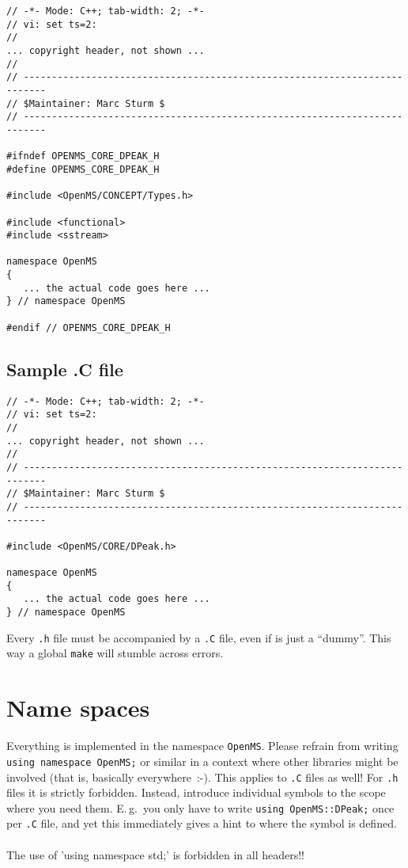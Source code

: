 \documentclass[a4]{article}
\begin{document}
\begin{footnotesize}
\begin{verbatim}
// -*- Mode: C++; tab-width: 2; -*-
// vi: set ts=2:
//
... copyright header, not shown ...
//
// --------------------------------------------------------------------------
// $Maintainer: Marc Sturm $
// --------------------------------------------------------------------------

#ifndef OPENMS_CORE_DPEAK_H
#define OPENMS_CORE_DPEAK_H

#include <OpenMS/CONCEPT/Types.h>

#include <functional>
#include <sstream>

namespace OpenMS
{
   ... the actual code goes here ...
} // namespace OpenMS

#endif // OPENMS_CORE_DPEAK_H
\end{verbatim}
\end{footnotesize}

\subsection{Sample .C file}

\begin{footnotesize}
\begin{verbatim}
// -*- Mode: C++; tab-width: 2; -*-
// vi: set ts=2:
//
... copyright header, not shown ...
//
// --------------------------------------------------------------------------
// $Maintainer: Marc Sturm $
// --------------------------------------------------------------------------

#include <OpenMS/CORE/DPeak.h>

namespace OpenMS
{
   ... the actual code goes here ...
} // namespace OpenMS

\end{verbatim}
\end{footnotesize}
Every \texttt{.h} file must be accompanied by a \texttt{.C} file, even if is
just a ``dummy''.  This way a global \texttt{make} will
stumble across errors.


\section{Name spaces}

Everything is implemented in the namespace \texttt{OpenMS}.  Please refrain
from writing \texttt{using namespace OpenMS;} or similar in a context where
other libraries might be involved (that is, basically everywhere~:-).  This
applies to \texttt{.C} files as well!  For \texttt{.h} files it is strictly
forbidden.  Instead, introduce individual symbols to the scope where you need
them.  E.\,g.\ you only have to write \texttt{using OpenMS::DPeak;} once per
\texttt{.C} file, and yet this immediately gives a hint to where the symbol is
defined.\\
\\
The use of 'using namespace std;' is forbidden in all headers!!
\end{document}
